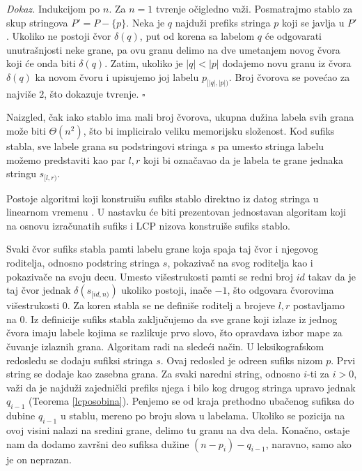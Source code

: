 \textit{Dokaz.} Indukcijom po $n$. Za $n=1$ tvr\dj enje o\v cigledno va\v zi. Posmatrajmo stablo za skup stringova $P' = P - \{p\}$. Neka je $q$ najdu\v zi prefiks stringa $p$ koji se javlja u $P'$. Ukoliko ne postoji \v cvor $\delta(q)$, put od korena sa labelom $q$ \' ce odgovarati unutra\v snjosti neke grane, pa ovu granu delimo na dve umetanjem novog \v cvora koji \' ce onda biti $\delta(q)$. Zatim, ukoliko je $|q| < |p|$ dodajemo novu granu iz \v cvora $\delta(q)$ ka novom \v cvoru i upisujemo joj labelu $p_{[|q|, |p|)}$. Broj \v cvorova se pove\' cao za najvi\v se $2$, \v sto dokazuje tvr\dj enje. \hfill $\square$

Naizgled, \v cak iako stablo ima mali broj \v cvorova, ukupna du\v zina labela svih grana mo\v ze biti $\Theta(n^2)$, \v sto bi impliciralo veliku memorijsku slo\v zenost. Kod sufiks stabla, sve labele grana su podstringovi stringa $s$ pa umesto stringa labelu mo\v zemo predstaviti kao par $l,r$ koji bi ozna\v cavao da je labela te grane jednaka stringu $s_{[l, r)}$.

Postoje algoritmi koji konstrui\v su sufiks stablo direktno iz datog stringa u linearnom vremenu \cite{suffixtreerad}. U nastavku \' ce biti prezentovan jednostavan algoritam koji na osnovu izra\v cunatih sufiks i LCP nizova konstrui\v se sufiks stablo.

\noindent
\begin{minipage}[l]{\textwidth}

\end{minipage}

Svaki \v cvor sufiks stabla pamti labelu grane koja spaja taj \v cvor i njegovog roditelja, odnosno podstring stringa $s$, pokaziva\v c na svog roditelja kao i pokaziva\v ce na svoju decu. Umesto vi\v sestrukosti pamti se redni broj $id$ takav da je taj \v cvor jednak $\delta(s_{[id,n)})$ ukoliko postoji, ina\v ce $-1$, \v sto odgovara \v cvorovima vi\v sestrukosti $0$. Za koren stabla se ne defini\v se roditelj a brojeve $l,r$ postavljamo na $0$. Iz definicije sufiks stabla zaklju\v cujemo da sve grane koji izlaze iz jednog \v cvora imaju labele kojima se razlikuje prvo slovo, \v sto opravdava izbor mape za \v cuvanje izlaznih grana. Algoritam radi na slede\' ci na\v cin. U leksikografskom redosledu se dodaju sufiksi stringa $s$. Ovaj redosled je odre\dj en sufiks nizom $p$. Prvi string se dodaje kao zasebna grana. Za svaki naredni string, odnosno $i$-ti za $i>0$, va\v zi da je najdu\v zi zajedni\v cki prefiks njega i bilo kog drugog stringa upravo jednak $q_{i-1}$ (Teorema \ref{lcposobina}). Penjemo se od kraja prethodno uba\v cenog sufiksa do dubine $q_{i-1}$ u stablu, mereno po broju slova u labelama. Ukoliko se pozicija na ovoj visini nalazi na sredini grane, delimo tu granu na dva dela. Kona\v cno, ostaje nam da dodamo zavr\v sni deo sufiksa du\v zine $(n-p_i)-q_{i-1}$, naravno, samo ako je on neprazan.

